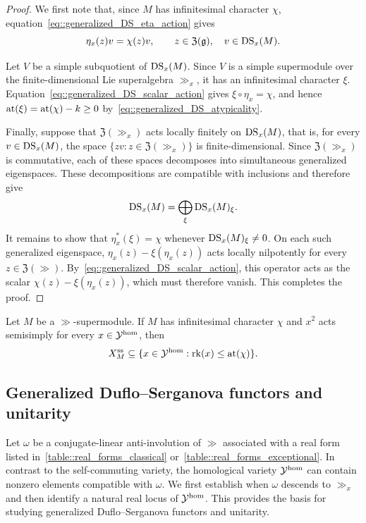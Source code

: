 \begin{proof}
We first note that, since $M$ has infinitesimal character $\chi$, equation~\eqref{eq::generalized_DS_eta_action} gives
\begin{equation}\label{eq::generalized_DS_scalar_action}
\eta_x(z)v=\chi(z)v,
\qquad
z\in\mathfrak{Z}({\mathfrak{g}}),\quad v\in\operatorname{DS}_x(M).
\end{equation}


Let $V$ be a simple subquotient of $\operatorname{DS}_x(M)$. Since $V$ is a simple supermodule over the finite-dimensional Lie superalgebra $\gg_x$, it has an infinitesimal character $\xi$. Equation~\eqref{eq::generalized_DS_scalar_action} gives $\xi\circ\eta_x=\chi$, and hence ${\operatorname{at}}(\xi)={\operatorname{at}}(\chi)-k\geq 0$ by~\eqref{eq::generalized_DS_atypicality}.


Finally, suppose that $\mathfrak{Z}(\gg_x)$ acts locally finitely on $\operatorname{DS}_x(M)$, that is, for every $v\in\operatorname{DS}_x(M)$, the space $\{zv:z\in\mathfrak{Z}(\gg_x)\}$ is finite-dimensional. Since $\mathfrak{Z}(\gg_x)$ is commutative, each of these spaces decomposes into simultaneous generalized eigenspaces. These decompositions are compatible with inclusions and therefore give
\begin{equation*}
\operatorname{DS}_x(M)=\bigoplus_\xi\operatorname{DS}_x(M)_\xi.
\end{equation*}
It remains to show that $\eta_x^\ast(\xi)=\chi$ whenever $\operatorname{DS}_x(M)_\xi\neq0$. On each such generalized eigenspace, $\eta_x(z)-\xi(\eta_x(z))$ acts locally nilpotently for every $z\in\mathfrak{Z}(\gg)$. By~\eqref{eq::generalized_DS_scalar_action}, this operator acts as the scalar $\chi(z)-\xi(\eta_x(z))$, which must therefore vanish. This completes the proof.
\end{proof}

\begin{corollary}
    Let $M$ be a $\gg$-supermodule. If $M$ has infinitesimal character $\chi$ and $x^2$ acts semisimply for every $x\in{\mathcal Y}^{\hom}$, then
\begin{equation*}\label{eq::semisimple_support_atypicality_bound}
X_M^{\mathrm{ss}}
\subseteq
\{
x\in{\mathcal Y}^{\hom}:
{\operatorname{rk}}(x)\leq{\operatorname{at}}(\chi)\}.
\end{equation*}
\end{corollary} 

\subsection{Generalized Duflo--Serganova functors and unitarity}

Let $\omega$ be a conjugate-linear anti-involution of $\gg$ associated with a real form listed in~\eqref{table::real_forms_classical} or~\eqref{table::real_forms_exceptional}. In contrast to the self-commuting variety, the homological variety ${\mathcal Y}^{\hom}$ can contain nonzero elements compatible with $\omega$. We first establish when $\omega$ descends to $\gg_x$ and then identify a natural real locus of ${\mathcal Y}^{\hom}$. This provides the basis for studying generalized Duflo--Serganova functors and unitarity.

